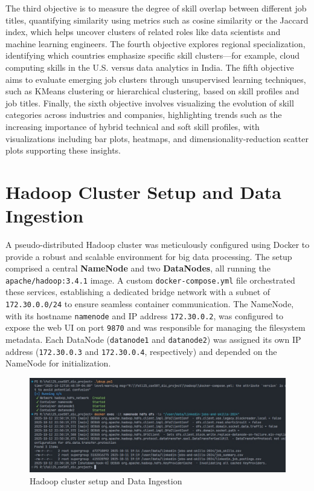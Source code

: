 \documentclass[conference]{IEEEtran}
\begin{document}
The third objective is to measure the degree of skill overlap between different job titles, quantifying similarity using metrics such as cosine similarity or the Jaccard index, which helps uncover clusters of related roles like data scientists and machine learning engineers. The fourth objective explores regional specialization, identifying which countries emphasize specific skill clusters—for example, cloud computing skills in the U.S. versus data analytics in India. The fifth objective aims to evaluate emerging job clusters through unsupervised learning techniques, such as KMeans clustering or hierarchical clustering, based on skill profiles and job titles. Finally, the sixth objective involves visualizing the evolution of skill categories across industries and companies, highlighting trends such as the increasing importance of hybrid technical and soft skill profiles, with visualizations including bar plots, heatmaps, and dimensionality-reduction scatter plots supporting these insights.

\section{\textbf{Hadoop Cluster Setup and Data Ingestion}}
A pseudo-distributed Hadoop cluster was meticulously configured using Docker to provide a robust and scalable environment for big data processing. The setup comprised a central \textbf{NameNode} and two \textbf{DataNodes}, all running the \texttt{apache/hadoop:3.4.1} image. A custom \texttt{docker-compose.yml} file orchestrated these services, establishing a dedicated bridge network with a subnet of \texttt{172.30.0.0/24} to ensure seamless container communication. The NameNode, with its hostname \texttt{namenode} and IP address \texttt{172.30.0.2}, was configured to expose the web UI on port \texttt{9870} and was responsible for managing the filesystem metadata. Each DataNode (\texttt{datanode1} and \texttt{datanode2}) was assigned its own IP address (\texttt{172.30.0.3} and \texttt{172.30.0.4}, respectively) and depended on the NameNode for initialization.
\begin{figure}
    \centering
    \includegraphics[width=0.5\linewidth]{ih.jpeg}
    \caption{Hadoop cluster setup and Data Ingestion}
    \label{fig:placeholder}
\end{figure}
\end{document}
